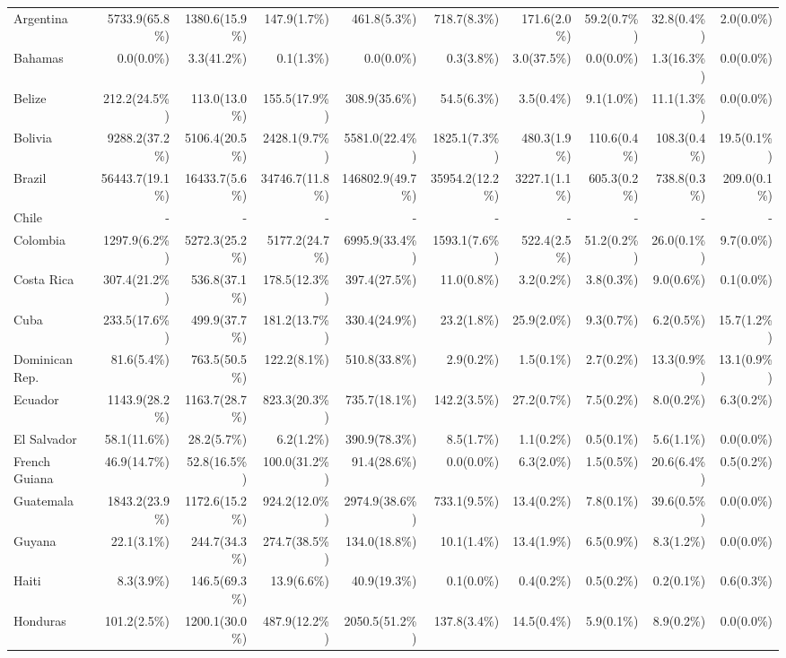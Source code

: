 \begin{scriptsize}
\begin{landscape}
\begin{center}
\begin{longtable}[ht]{lrrrrrrrrr}
			Argentina&5733.9(65.8\%)&1380.6(15.9\%)&147.9(1.7\%)&461.8(5.3\%)&718.7(8.3\%)&171.6(2.0\%)&59.2(0.7\%)&32.8(0.4\%)&2.0(0.0\%)\\
			Bahamas&0.0(0.0\%)&3.3(41.2\%)&0.1(1.3\%)&0.0(0.0\%)&0.3(3.8\%)&3.0(37.5\%)&0.0(0.0\%)&1.3(16.3\%)&0.0(0.0\%)\\
			Belize&212.2(24.5\%)&113.0(13.0\%)&155.5(17.9\%)&308.9(35.6\%)&54.5(6.3\%)&3.5(0.4\%)&9.1(1.0\%)&11.1(1.3\%)&0.0(0.0\%)\\
			Bolivia&9288.2(37.2\%)&5106.4(20.5\%)&2428.1(9.7\%)&5581.0(22.4\%)&1825.1(7.3\%)&480.3(1.9\%)&110.6(0.4\%)&108.3(0.4\%)&19.5(0.1\%)\\
			Brazil&56443.7(19.1\%)&16433.7(5.6\%)&34746.7(11.8\%)&146802.9(49.7\%)&35954.2(12.2\%)&3227.1(1.1\%)&605.3(0.2\%)&738.8(0.3\%)&209.0(0.1\%)\\
			Chile&-&-&-&-&-&-&-&-&-\\
			Colombia&1297.9(6.2\%)&5272.3(25.2\%)&5177.2(24.7\%)&6995.9(33.4\%)&1593.1(7.6\%)&522.4(2.5\%)&51.2(0.2\%)&26.0(0.1\%)&9.7(0.0\%)\\
			Costa Rica&307.4(21.2\%)&536.8(37.1\%)&178.5(12.3\%)&397.4(27.5\%)&11.0(0.8\%)&3.2(0.2\%)&3.8(0.3\%)&9.0(0.6\%)&0.1(0.0\%)\\
			Cuba&233.5(17.6\%)&499.9(37.7\%)&181.2(13.7\%)&330.4(24.9\%)&23.2(1.8\%)&25.9(2.0\%)&9.3(0.7\%)&6.2(0.5\%)&15.7(1.2\%)\\
			Dominican Rep.&81.6(5.4\%)&763.5(50.5\%)&122.2(8.1\%)&510.8(33.8\%)&2.9(0.2\%)&1.5(0.1\%)&2.7(0.2\%)&13.3(0.9\%)&13.1(0.9\%)\\
			Ecuador&1143.9(28.2\%)&1163.7(28.7\%)&823.3(20.3\%)&735.7(18.1\%)&142.2(3.5\%)&27.2(0.7\%)&7.5(0.2\%)&8.0(0.2\%)&6.3(0.2\%)\\
			El Salvador&58.1(11.6\%)&28.2(5.7\%)&6.2(1.2\%)&390.9(78.3\%)&8.5(1.7\%)&1.1(0.2\%)&0.5(0.1\%)&5.6(1.1\%)&0.0(0.0\%)\\
			French Guiana&46.9(14.7\%)&52.8(16.5\%)&100.0(31.2\%)&91.4(28.6\%)&0.0(0.0\%)&6.3(2.0\%)&1.5(0.5\%)&20.6(6.4\%)&0.5(0.2\%)\\
			Guatemala&1843.2(23.9\%)&1172.6(15.2\%)&924.2(12.0\%)&2974.9(38.6\%)&733.1(9.5\%)&13.4(0.2\%)&7.8(0.1\%)&39.6(0.5\%)&0.0(0.0\%)\\
			Guyana&22.1(3.1\%)&244.7(34.3\%)&274.7(38.5\%)&134.0(18.8\%)&10.1(1.4\%)&13.4(1.9\%)&6.5(0.9\%)&8.3(1.2\%)&0.0(0.0\%)\\
			Haiti&8.3(3.9\%)&146.5(69.3\%)&13.9(6.6\%)&40.9(19.3\%)&0.1(0.0\%)&0.4(0.2\%)&0.5(0.2\%)&0.2(0.1\%)&0.6(0.3\%)\\
			Honduras&101.2(2.5\%)&1200.1(30.0\%)&487.9(12.2\%)&2050.5(51.2\%)&137.8(3.4\%)&14.5(0.4\%)&5.9(0.1\%)&8.9(0.2\%)&0.0(0.0\%)\\

\end{longtable}
\end{center}
\end{landscape}
\end{scriptsize}
